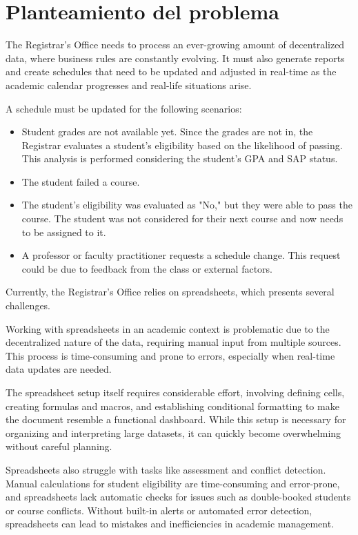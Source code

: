 \section{Planteamiento del problema}

The Registrar's Office needs to process an ever-growing amount of decentralized data, where business rules are constantly evolving. It must also generate reports and create schedules that need to be updated and adjusted in real-time as the academic calendar progresses and real-life situations arise.

A schedule must be updated for the following scenarios:

\begin{itemize}
    \item Student grades are not available yet. Since the grades are not in, the Registrar evaluates a student's eligibility based on the likelihood of passing. This analysis is performed considering the student's GPA and SAP status.
    \item The student failed a course.
    \item The student’s eligibility was evaluated as "No," but they were able to pass the course. The student was not considered for their next course and now needs to be assigned to it.
    \item A professor or faculty practitioner requests a schedule change. This request could be due to feedback from the class or external factors.
\end{itemize}

Currently, the Registrar's Office relies on spreadsheets, which presents several challenges.

Working with spreadsheets in an academic context is problematic due to the decentralized nature of the data, requiring manual input from multiple sources. This process is time-consuming and prone to errors, especially when real-time data updates are needed.

The spreadsheet setup itself requires considerable effort, involving defining cells, creating formulas and macros, and establishing conditional formatting to make the document resemble a functional dashboard. While this setup is necessary for organizing and interpreting large datasets, it can quickly become overwhelming without careful planning.

Spreadsheets also struggle with tasks like assessment and conflict detection. Manual calculations for student eligibility are time-consuming and error-prone, and spreadsheets lack automatic checks for issues such as double-booked students or course conflicts. Without built-in alerts or automated error detection, spreadsheets can lead to mistakes and inefficiencies in academic management.

